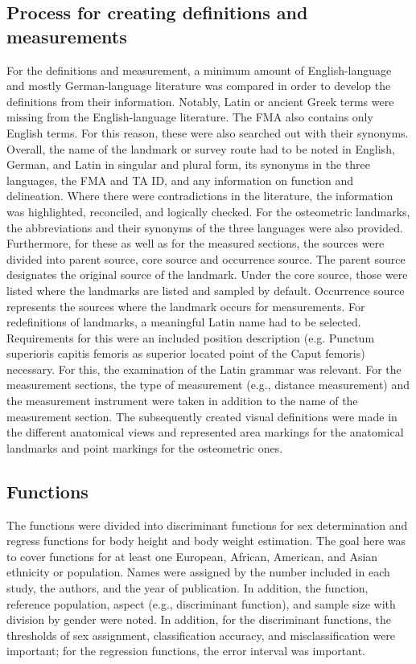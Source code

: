 \documentclass[sw]{iosart2x}
\begin{document}
\subsection{Process for creating definitions and measurements}
For the definitions and measurement, a minimum amount of English-language and mostly German-language literature was compared in order to develop the definitions from their information.
Notably, Latin or ancient Greek terms were missing from the English-language literature.
The FMA also contains only English terms.
For this reason, these were also searched out with their synonyms.
Overall, the name of the landmark or survey route had to be noted in English, German, and Latin in singular and plural form, its synonyms in the three languages, the FMA and TA ID, and any information on function and delineation.
Where there were contradictions in the literature, the information was highlighted, reconciled, and logically checked.
For the osteometric landmarks, the abbreviations and their synonyms of the three languages were also provided.
Furthermore, for these as well as for the measured sections, the sources were divided into parent source, core source and occurrence source.
The parent source designates the original source of the landmark.
Under the core source, those were listed where the landmarks are listed and sampled by default.
Occurrence source represents the sources where the landmark occurs for measurements.
For redefinitions of landmarks, a meaningful Latin name had to be selected.
Requirements for this were an included position description (e.g. Punctum superioris capitis femoris as superior located point of the Caput femoris) necessary.
For this, the examination of the Latin grammar was relevant.
For the measurement sections, the type of measurement (e.g., distance measurement) and the measurement instrument were taken in addition to the name of the measurement section.
The subsequently created visual definitions were made in the different anatomical views and represented area markings for the anatomical landmarks and point markings for the osteometric ones.

\subsection{Functions}
The functions were divided into discriminant functions for sex determination and regress functions for body height and body weight estimation.
The goal here was to cover functions for at least one European, African, American, and Asian ethnicity or population.
Names were assigned by the number included in each study, the authors, and the year of publication.
In addition, the function, reference population, aspect (e.g., discriminant function), and sample size with division by gender were noted.
In addition, for the discriminant functions, the thresholds of sex assignment, classification accuracy, and misclassification were important; for the regression functions, the error interval was important.
\end{document}
